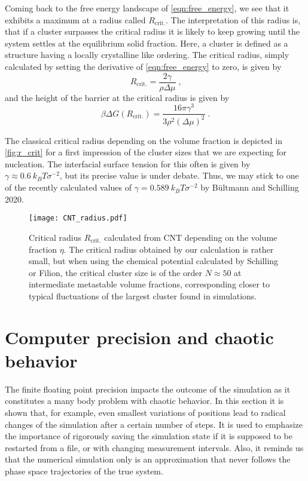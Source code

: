 Coming back to the free energy landscape of \autoref{eqn:free_energy}, we see that it exhibits a maximum at a radius called $R_{\text{crit.}}$. The interpretation of this radius is, that if a cluster surpasses the critical radius it is likely to keep growing until the system settles at the equilibrium solid fraction. Here, a cluster is defined as a structure having a locally crystalline like ordering. The critical radius, simply calculated by setting the derivative of \autoref{eqn:free_energy} to zero, is given by
\begin{equation}
\label{eqn:r_crit}
R_{\text{crit.}} = \frac{2 \gamma}{\rho \Delta \mu } \; \text{,}
\end{equation}
and the height of the barrier at the critical radius is given by
\begin{equation}
\beta \Delta G (R_{\text{crit.}}) = \frac{16 \pi \gamma^3}{3 \rho^2 (\Delta \mu )^2} \; \text{.}
\end{equation}

The classical critical radius depending on the volume fraction is depicted in \autoref{fig:r_crit} for a first impression of the cluster sizes that we are expecting for nucleation. The interfacial surface tension for this often is given by $\gamma \approx \SI{0.6}{k_B T \sigma^{-2}}$, but its precise value is under debate. Thus, we may stick to one of the recently calculated values of $\gamma = \SI{0.589}{k_B T \sigma^{-2}}$ by Bültmann and Schilling 2020\cite{Bultmann2020}. 
\begin{figure}[h]
\centering
\texttt{[image: CNT\_radius.pdf]}
\caption[Critical radius in the metastable regime]{Critical radius $R_{\text{crit.}}$ calculated from CNT depending on the volume fraction $\eta$. The critical radius obtained by our calculation is rather small, but when using the chemical potential calculated by Schilling or Filion\cite{Schilling2011, Filion2010a}, the critical cluster size is of the order $N \approx 50$ at intermediate metastable volume fractions, corresponding closer to typical fluctuations of the largest cluster found in simulations.}
\label{fig:r_crit}
\end{figure}

\section{Computer precision and chaotic behavior}
\label{sec:precision}
The finite floating point precision impacts the outcome of the simulation as it constitutes a many body problem with chaotic behavior. In this section it is shown that, for example, even smallest variations of positions lead to radical changes of the simulation after a certain number of steps. It is used to emphasize the importance of rigorously saving the simulation state if it is supposed to be restarted from a file, or with changing measurement intervals. Also, it reminds us that the numerical simulation only is an approximation that never follows the phase space trajectories of the true system.\\

